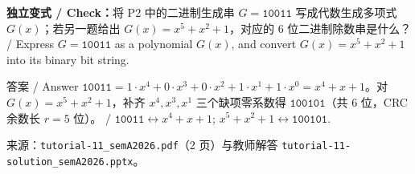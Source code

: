 \textbf{独立变式 / Check：}将 P2 中的二进制生成串 $G = \mathtt{10011}$ 写成代数生成多项式 $G(x)$；若另一题给出 $G(x) = x^5 + x^2 + 1$，对应的 6 位二进制除数串是什么？ / Express $G = \mathtt{10011}$ as a polynomial $G(x)$, and convert $G(x) = x^5 + x^2 + 1$ into its binary bit string.

\begin{StudySolution}{答案 / Answer}
$\mathtt{10011} = 1\cdot x^4 + 0\cdot x^3 + 0\cdot x^2 + 1\cdot x^1 + 1\cdot x^0 = x^4 + x + 1$。对 $G(x) = x^5 + x^2 + 1$，补齐 $x^4, x^3, x^1$ 三个缺项零系数得 $\mathtt{100101}$（共 6 位，CRC 余数长 $r=5$ 位）。 / $\mathtt{10011} \leftrightarrow x^4 + x + 1$; $x^5 + x^2 + 1 \leftrightarrow \mathtt{100101}$.
\end{StudySolution}

来源：\texttt{tutorial-11\_semA2026.pdf}（2 页）与教师解答 \texttt{tutorial-11-solution\_semA2026.pptx}。
